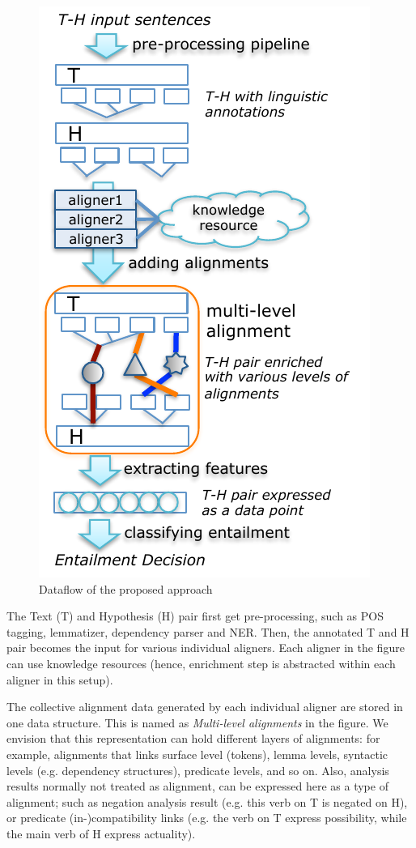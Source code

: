 \documentclass[11pt,letterpaper]{article}
\begin{document}
\begin{figure}[t!b]
  \centering
  \includegraphics[width=0.9\columnwidth]{figures/figure1.pdf}
  \caption{Dataflow of the proposed approach}
  \label{fig:1}
\end{figure}

The Text (T) and Hypothesis (H) pair first get pre-processing, such as
POS tagging, lemmatizer, dependency parser and NER. Then, the 
annotated T and H pair becomes the input for various individual
aligners. Each aligner in the figure can use knowledge resources
(hence, enrichment step is abstracted within each aligner in
this setup).

The collective alignment data generated by each individual aligner are
stored in one data structure. This is named as {\em Multi-level
  alignments} in the figure. We envision that this representation can
hold different layers of alignments: for example, alignments that
links surface level (tokens), lemma levels, syntactic levels
(e.g. dependency structures), predicate levels, and so on. Also,
analysis results normally not treated as alignment, can be expressed
here as a type of alignment; such as negation analysis result
(e.g. this verb on T is negated on H), or predicate (in-)compatibility
links (e.g. the verb on T express possibility, while the main verb of
H express actuality). 
\end{document}
